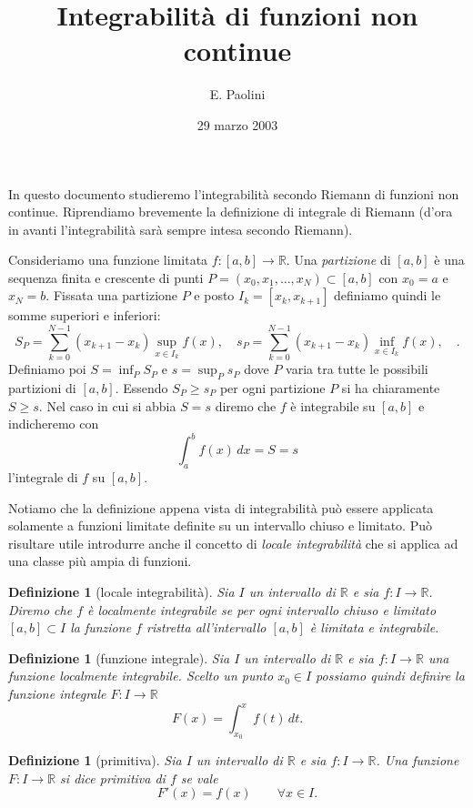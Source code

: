 \documentclass[italian,a4paper]{article}
\title{\bf Integrabilit\`a di funzioni non continue}
\author{E. Paolini}
\date{29 marzo 2003}
\newcommand{\R}{\mathbb{R}}
\newtheorem{definition}[theorem]{Definizione}
\begin{document}
\maketitle

In questo documento studieremo l'integrabilit\`a secondo Riemann di
funzioni non continue. Riprendiamo brevemente la definizione di
integrale di Riemann (d'ora in avanti l'integrabilit\`a sar\`a sempre
intesa secondo Riemann).

Consideriamo una funzione limitata $f\colon [a,b]\to \R$. 
Una \emph{partizione} di $[a,b]$ \`e una sequenza finita e crescente di punti
$P=(x_0,x_1,\ldots,x_N)\subset [a,b]$ con $x_0=a$ e $x_N=b$.
Fissata una partizione $P$ e posto $I_k=[x_k,x_{k+1}]$ 
definiamo quindi le somme superiori e
inferiori:
\[
	S_P = \sum_{k=0}^{N-1} (x_{k+1}-x_k) \sup_{x\in I_k} f(x),\quad
	s_P = \sum_{k=0}^{N-1} (x_{k+1}-x_k) \inf_{x\in I_k} f(x),\quad.
\]
Definiamo poi $S=\inf_P S_P$ e $s=\sup_P s_P$ dove $P$ varia tra tutte
le possibili partizioni di $[a,b]$.
Essendo $S_P\ge s_P$ per ogni partizione $P$ si ha chiaramente $S\ge
s$.
Nel caso in cui si abbia $S=s$ diremo che $f$ \`e integrabile su
$[a,b]$ e indicheremo con
\[
	\int_a^b f(x)\, dx = S = s
\]
l'integrale di $f$ su $[a,b]$.

Notiamo che la definizione appena vista di integrabilit\`a pu\`o
essere applicata solamente a funzioni limitate definite su un
intervallo chiuso e limitato. Pu\`o risultare utile introdurre anche
il concetto di \emph{locale integrabilit\`a} che si applica ad una
classe pi\`u ampia di funzioni.
 
\begin{definition}[locale integrabilit\`a]
Sia $I$ un intervallo di $\R$ e sia $f\colon I \to \R$. Diremo che $f$
\`e localmente integrabile se per ogni intervallo chiuso e limitato
$[a,b]\subset I$ la funzione $f$ ristretta all'intervallo $[a,b]$
\`e limitata e integrabile.
\end{definition}

\begin{definition}[funzione integrale]
Sia $I$ un intervallo di $\R$ e sia $f\colon I \to \R$ una funzione
localmente integrabile.
Scelto un punto $x_0\in I$ possiamo quindi definire la \emph{funzione
integrale} $F\colon I\to\R$
\[
	F(x)=\int_{x_0}^x f(t)\, dt.
\]
\end{definition}

\begin{definition}[primitiva]
Sia $I$ un intervallo di $\R$ e sia $f\colon I\to \R$. Una funzione
$F\colon I\to \R$ si dice \emph{primitiva} di $f$ se vale
\[
	F'(x) = f(x)\qquad \forall x\in I.
\]
\end{definition}
\end{document}
